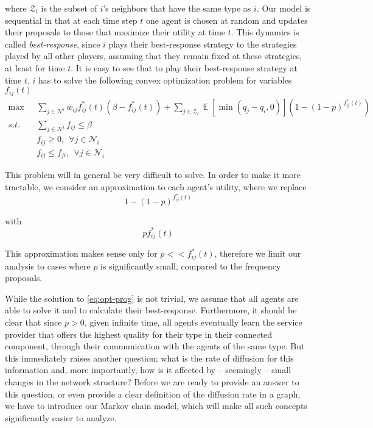 \documentclass[format=acmsmall, review=false]{acmart}
\newcommand{\Ex}{\mathop{\mathbb{E}}}
\begin{document}
where $\mathcal{Z}_i$ is the subset of $i$'s neighbors that have the same type as $i$. Our model is sequential in that at each
time step $t$ one agent is chosen at random and updates their proposals to those that maximize their utility at time $t$.
This dynamics is called \textit{best-response}, since $i$ plays their best-response strategy to the strategies played by all
other players, assuming that they remain fixed at these strategies, at least for time $t$. It is easy to see that to play their
best-response strategy at time $t$, $i$ has to solve the following convex optimization problem for variables $f_{ij}(t)$
\begin{align}\label{eq:opt-prog}
\max & \: \: \: \sum_{j \in \mathcal{N}^i} {w_{ij} f^*_{ij}(t) \left( \beta - f^*_{ij}(t) \right) } +
\sum_{j \in \mathcal{Z}_i} {\Ex \left[ \min \left( q_j - q_i, 0 \right) \right] \left( 1 - {\left( 1 - p \right)}^{f^*_{ij}(t)} \right) } \\
s.t. & \: \: \: \sum_{j \in \mathcal{N}^i} {f_{ij}} \leq \beta \nonumber \\
& \: \: \: f_{ij} \geq 0, \: \: \forall j \in \mathcal{N}_i \nonumber \\
& \: \: \: f_{ij} \leq f_{ji}, \: \: \forall j \in \mathcal{N}_i \nonumber
\end{align}

\par This problem will in general be very difficult to solve. In order to make it more tractable, we consider an approximation
to each agent's utility, where we replace
\[
1 - {\left( 1 - p \right)}^{f^*_{ij}(t)}
\]

with 
\[
p f^*_{ij}(t)
\]

This approximation makes sense only for $p << f^*_{ij}(t)$, therefore we limit our analysis to cases where $p$ is significantly
small, compared to the frequency proposals.

\par While the solution to \eqref{eq:opt-prog} is not trivial, we assume that all agents are able to solve it and to calculate
their best-response. Furthermore, it should be clear that since $p > 0$, given infinite time, all agents eventually learn
the service provider that offers the highest quality for their type in their connected component, through their communication with
the agents of the same type. But this immediately raises another question; what is the rate of diffusion for this information and,
more importantly, how is it affected by -- seemingly -- small changes in the network structure? Before we are ready to provide an
answer to this question, or even provide a clear definition of the diffusion rate in a graph, we have to introduce our Markov chain
model, which will make all such concepts significantly easier to analyze.
\end{document}
